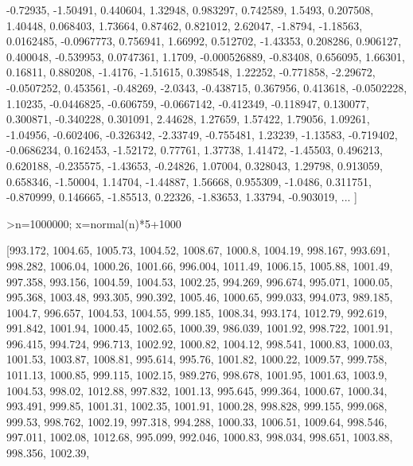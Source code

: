 \documentclass{article}
\begin{document}
\begin{eulernotebook}
\begin{eulercomment}
\begin{eulercomment}
\begin{euleroutput}
  -0.72935,  -1.50491,  0.440604,  1.32948,  0.983297,  0.742589,
  1.5493,  0.207508,  1.40448,  0.068403,  1.73664,  0.87462,  0.821012,
  2.62047,  -1.8794,  -1.18563,  0.0162485,  -0.0967773,  0.756941,
  1.66992,  0.512702,  -1.43353,  0.208286,  0.906127,  0.400048,
  -0.539953,  0.0747361,  1.1709,  -0.000526889,  -0.83408,  0.656095,
  1.66301,  0.16811,  0.880208,  -1.4176,  -1.51615,  0.398548,
  1.22252,  -0.771858,  -2.29672,  -0.0507252,  0.453561,  -0.48269,
  -2.0343,  -0.438715,  0.367956,  0.413618,  -0.0502228,  1.10235,
  -0.0446825,  -0.606759,  -0.0667142,  -0.412349,  -0.118947,
  0.130077,  0.300871,  -0.340228,  0.301091,  2.44628,  1.27659,
  1.57422,  1.79056,  1.09261,  -1.04956,  -0.602406,  -0.326342,
  -2.33749,  -0.755481,  1.23239,  -1.13583,  -0.719402,  -0.0686234,
  0.162453,  -1.52172,  0.77761,  1.37738,  1.41472,  -1.45503,
  0.496213,  0.620188,  -0.235575,  -1.43653,  -0.24826,  1.07004,
  0.328043,  1.29798,  0.913059,  0.658346,  -1.50004,  1.14704,
  -1.44887,  1.56668,  0.955309,  -1.0486,  0.311751,  -0.870999,
  0.146665,  -1.85513,  0.22326,  -1.83653,  1.33794,  -0.903019,
   ... ]
\end{euleroutput}
\begin{eulerprompt}
>n=1000000; x=normal(n)*5+1000
\end{eulerprompt}
\begin{euleroutput}
  [993.172,  1004.65,  1005.73,  1004.52,  1008.67,  1000.8,  1004.19,
  998.167,  993.691,  998.282,  1006.04,  1000.26,  1001.66,  996.004,
  1011.49,  1006.15,  1005.88,  1001.49,  997.358,  993.156,  1004.59,
  1004.53,  1002.25,  994.269,  996.674,  995.071,  1000.05,  995.368,
  1003.48,  993.305,  990.392,  1005.46,  1000.65,  999.033,  994.073,
  989.185,  1004.7,  996.657,  1004.53,  1004.55,  999.185,  1008.34,
  993.174,  1012.79,  992.619,  991.842,  1001.94,  1000.45,  1002.65,
  1000.39,  986.039,  1001.92,  998.722,  1001.91,  996.415,  994.724,
  996.713,  1002.92,  1000.82,  1004.12,  998.541,  1000.83,  1000.03,
  1001.53,  1003.87,  1008.81,  995.614,  995.76,  1001.82,  1000.22,
  1009.57,  999.758,  1011.13,  1000.85,  999.115,  1002.15,  989.276,
  998.678,  1001.95,  1001.63,  1003.9,  1004.53,  998.02,  1012.88,
  997.832,  1001.13,  995.645,  999.364,  1000.67,  1000.34,  993.491,
  999.85,  1001.31,  1002.35,  1001.91,  1000.28,  998.828,  999.155,
  999.068,  999.53,  998.762,  1002.19,  997.318,  994.288,  1000.33,
  1006.51,  1009.64,  998.546,  997.011,  1002.08,  1012.68,  995.099,
  992.046,  1000.83,  998.034,  998.651,  1003.88,  998.356,  1002.39,

\end{euleroutput}
\end{eulercomment}
\end{eulercomment}
\end{eulernotebook}
\end{document}
